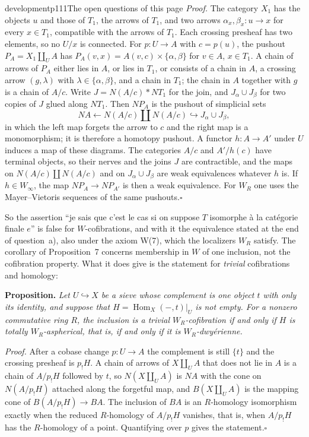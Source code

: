 \begin{enumerate}[label=\alph*)]
\begin{dcomment}{development}{p111}{The open questions of this page}
\textit{Proof.}
The category $X_1$ has the objects $u$ and those of $T_1$, the arrows of $T_1$, and two arrows $\alpha_x,\beta_x:u\to x$ for every $x\in T_1$, compatible with the arrows of $T_1$. Each crossing presheaf has two elements, so no $U/x$ is connected. For $p:U\to A$ with $c=p(u)$, the pushout $P_A=X_1\amalg_UA$ has $P_A(v,x)=A(v,c)\times\{\alpha,\beta\}$ for $v\in A$, $x\in T_1$. A chain of arrows of $P_A$ either lies in $A$, or lies in $T_1$, or consists of a chain in $A$, a crossing arrow $(g,\lambda)$ with $\lambda\in\{\alpha,\beta\}$, and a chain in $T_1$; the chain in $A$ together with $g$ is a chain of $A/c$. Write $J=N(A/c)*NT_1$ for the join, and $J_\alpha\cup J_\beta$ for two copies of $J$ glued along $NT_1$. Then $NP_A$ is the pushout of simplicial sets
\[
 NA\longleftarrow N(A/c)\amalg N(A/c)\hookrightarrow J_\alpha\cup J_\beta ,
\]
in which the left map forgets the arrow to $c$ and the right map is a monomorphism; it is therefore a homotopy pushout. A functor $h:A\to A'$ under $U$ induces a map of these diagrams. The categories $A/c$ and $A'/h(c)$ have terminal objects, so their nerves and the joins $J$ are contractible, and the maps on $N(A/c)\amalg N(A/c)$ and on $J_\alpha\cup J_\beta$ are weak equivalences whatever $h$ is. If $h\in W_\infty$, the map $NP_A\to NP_{A'}$ is then a weak equivalence. For $W_R$ one uses the Mayer--Vietoris sequences of the same pushouts.\hfill$\square$

So the assertion ``je sais que c'est le cas si on suppose $T$ isomorphe \`a la cat\'egorie finale $e$'' is false for $W$-cofibrations, and with it the equivalence stated at the end of question~a), also under the axiom W(7), which the localizers $W_R$ satisfy. The corollary of Proposition~7 concerns membership in $W$ of one inclusion, not the cofibration property. What it does give is the statement for \emph{trivial} cofibrations and homology:

\textbf{Proposition.}\ours
\textit{Let $U\hookrightarrow X$ be a sieve whose complement is one object $t$ with only its identity, and suppose that $H=\operatorname{Hom}_X(-,t)|_U$ is not empty. For a nonzero commutative ring $R$, the inclusion is a trivial $W_R$-cofibration if and only if $H$ is totally $W_R$-aspherical, that is, if and only if it is $W_R$-dwy\'erienne.}

\textit{Proof.}
After a cobase change $p:U\to A$ the complement is still $\{t\}$ and the crossing presheaf is $p_!H$. A chain of arrows of $X\amalg_UA$ that does not lie in $A$ is a chain of $A/p_!H$ followed by $t$, so $N(X\amalg_UA)$ is $NA$ with the cone on $N(A/p_!H)$ attached along the forgetful map, and $B(X\amalg_UA)$ is the mapping cone of $B(A/p_!H)\to BA$. The inclusion of $BA$ is an $R$-homology isomorphism exactly when the reduced $R$-homology of $A/p_!H$ vanishes, that is, when $A/p_!H$ has the $R$-homology of a point. Quantifying over $p$ gives the statement.\hfill$\square$


\end{dcomment}
\end{enumerate}
